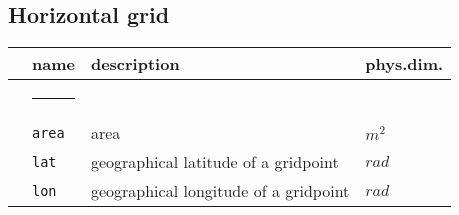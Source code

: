 \subsection{Horizontal grid}  
\begin{tabular}{l l l l}  
& \parbox{.15\textwidth}{name} & \parbox{.65\textwidth}{description} & 
\parbox{.1\textwidth}{phys.dim.} \\ \hline  
& \rule{4ex}{0pt} & \\[-10pt]  
 & \texttt{area}   & area & $m^2$ \\  
 & \texttt{lat}   & geographical latitude of a gridpoint & $rad$ \\  
 & \texttt{lon}   & geographical longitude of a gridpoint & $rad$ \\[5pt]
\end{tabular}  

